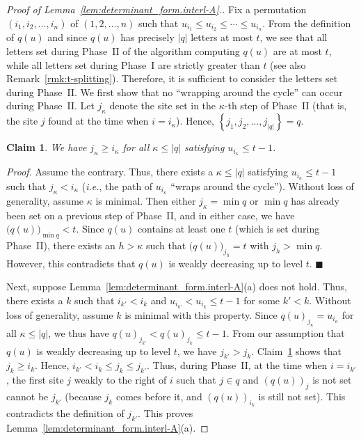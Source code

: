 \documentclass[reqno]{amsart}
\newcommand{\0}{\phantom{c}}
\newenvironment{subproof}{\textit{Proof.} }{\hfill$\blacksquare$ \medskip}
\newcommand{\set}[1]{\left\{ #1 \right\}}
\newcommand{\abs}[1]{\left| #1 \right|}
\newcommand{\tup}[1]{\left( #1 \right)}
\theoremstyle{plain}
\newtheorem{claim}[thm]{Claim}
\theoremstyle{definition}
\numberwithin{equation}{section}
\begin{document}
\begin{proof}[Proof of Lemma~\ref{lem:determinant_form.interl-A}.]
Fix a permutation $\tup{i_1, i_2, \dotsc, i_n}$ of $\tup{1, 2, \dotsc, n}$ such that $u_{i_1}\leq u_{i_2}\leq \cdots \leq u_{i_n}$.
From the definition of $q(u)$ and since $q(u)$ has precisely $\abs{q}$ letters at most $t$,
we see that
all letters set during Phase~II of the algorithm computing $q(u)$ are at most $t$,
while all letters set during Phase~I are strictly greater than $t$
(see also Remark~\ref{rmk:t-splitting}).
Therefore, it is sufficient to consider the letters set during Phase~II.
We first show that no ``wrapping around the cycle'' can occur during Phase~II.
Let $j_{\kappa}$ denote the site set in the $\kappa$-th step of Phase~II
(that is, the site $j$ found at the time when $i = i_\kappa$).
Hence, $\set{j_1, j_2, \ldots, j_{\abs{q}}} = q$.

\begin{claim}
\label{claim:no_wrapping}
We have $j_{\kappa} \geq i_{\kappa}$ for all $\kappa \leq \abs{q}$ satisfying $u_{i_{\kappa}} \leq t-1$.
\end{claim}

\begin{subproof}
Assume the contrary.
Thus, there exists a $\kappa \leq \abs{q}$ satisfying $u_{i_{\kappa}} \leq t-1$ such that $j_{\kappa} < i_{\kappa}$ (\textit{i.e.}, the path of $u_{i_{\kappa}}$ ``wraps around the cycle'').
Without loss of generality, assume $\kappa$ is minimal.
Then either $j_{\kappa} = \min q$ or $\min q$ has already been set on a previous step of Phase~II, and in either case, we have $\bigl( q(u) \bigr)_{\min q} < t$.
Since $q(u)$ contains at least one $t$ (which is set during Phase~II), there exists an $h > \kappa$ such that $\bigl( q(u) \bigr)_{j_h} = t$ with $j_h > \min q$.
However, this contradicts that $q(u)$ is weakly decreasing up to level $t$.
\end{subproof}

Next, suppose Lemma~\ref{lem:determinant_form.interl-A}(a) does not hold.
Thus, there exists a $k$ such that $i_{k'} < i_k$ and $u_{i_{k'}} < u_{i_k} \leq t-1$ for some $k' < k$.
Without loss of generality, assume $k$ is minimal with this property.
Since $q(u)_{j_{\kappa}} = u_{i_{\kappa}}$ for all $\kappa \leq \abs{q}$,
we thus have $q(u)_{j_{k'}} < q(u)_{j_k} \leq t-1$.
From our assumption that $q(u)$ is weakly decreasing up to level $t$, we have $j_{k'} > j_k$.
Claim~\ref{claim:no_wrapping} shows that $j_k \geq i_k$.
Hence, $i_{k'} < i_k \leq j_k \leq j_{k'}$.
Thus, during Phase~II, at the time when $i = i_{k'}$, the first site $j$ weakly to the right of $i$ such that $j \in q$ and $(q(u))_j$ is not set cannot be $j_{k'}$ (because $j_k$ comes before it, and $(q(u))_{i_k}$ is still not set).
This contradicts the definition of $j_{k'}$.
This proves Lemma~\ref{lem:determinant_form.interl-A}(a).


\end{proof}
\end{document}
